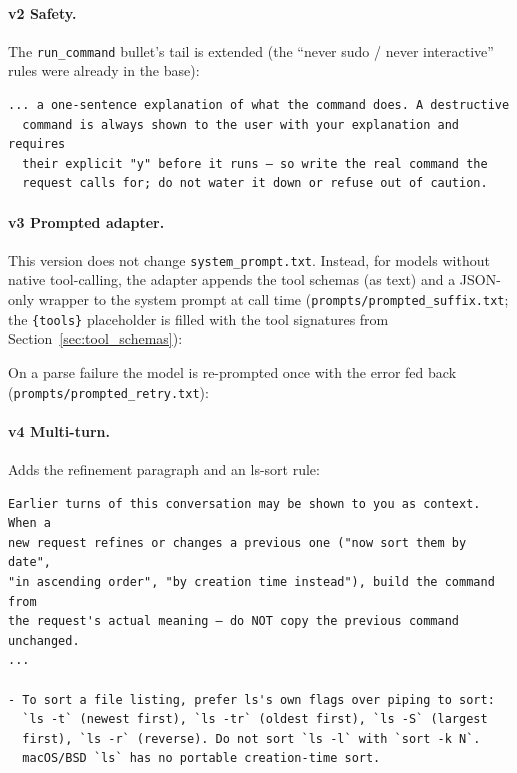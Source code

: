 \documentclass[11pt,a4paper]{article}
\begin{document}
\paragraph{v2 Safety.} The \texttt{run\_command} bullet's tail is extended (the ``never sudo / never interactive'' rules were already in the base):
\begin{lstlisting}[numbers=none, basicstyle=\ttfamily\scriptsize, breaklines=true]
  ... a one-sentence explanation of what the command does. A destructive
  command is always shown to the user with your explanation and requires
  their explicit "y" before it runs — so write the real command the
  request calls for; do not water it down or refuse out of caution.
\end{lstlisting}

\paragraph{v3 Prompted adapter.} This version does not change \texttt{system\_prompt.txt}. Instead, for models without native tool-calling, the adapter appends the tool schemas (as text) and a JSON-only wrapper to the system prompt at call time (\texttt{prompts/prompted\_suffix.txt}; the \texttt{\{tools\}} placeholder is filled with the tool signatures from Section~\ref{sec:tool_schemas}):

On a parse failure the model is re-prompted once with the error fed back (\texttt{prompts/prompted\_retry.txt}):


\paragraph{v4 Multi-turn.} Adds the refinement paragraph and an ls-sort rule:
\begin{lstlisting}[numbers=none, basicstyle=\ttfamily\scriptsize, breaklines=true]
Earlier turns of this conversation may be shown to you as context. When a
new request refines or changes a previous one ("now sort them by date",
"in ascending order", "by creation time instead"), build the command from
the request's actual meaning — do NOT copy the previous command unchanged.
...

- To sort a file listing, prefer ls's own flags over piping to sort:
  `ls -t` (newest first), `ls -tr` (oldest first), `ls -S` (largest
  first), `ls -r` (reverse). Do not sort `ls -l` with `sort -k N`.
  macOS/BSD `ls` has no portable creation-time sort.
\end{lstlisting}
\end{document}
